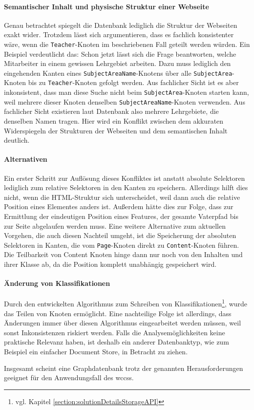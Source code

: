     \paragraph{Semantischer Inhalt und physische Struktur einer Webseite}
    Genau betrachtet spiegelt die Datenbank lediglich die Struktur der Webseiten exakt wider.
    Trotzdem lässt sich argumentieren, dass es fachlich konsistenter wäre,
    wenn die \texttt{Teacher}-Knoten im beschriebenen Fall geteilt werden würden.
    Ein Beispiel verdeutlicht das:
    Schon jetzt lässt sich die Frage beantworten,
    welche Mitarbeiter in einem gewissen Lehrgebiet arbeiten.
    Dazu muss lediglich den eingehenden Kanten eines
    \texttt{SubjectAreaName}-Knotens über alle \texttt{SubjectArea}-Knoten
    bis zu \texttt{Teacher}-Knoten gefolgt werden.
    Aus fachlicher Sicht ist es aber inkonsistent,
    dass man diese Suche nicht beim \texttt{SubjectArea}-Knoten
    starten kann, weil mehrere dieser Knoten denselben
    \texttt{SubjectAreaName}-Knoten verwenden.
    Aus fachlicher Sicht existieren laut Datenbank also mehrere Lehrgebiete,
    die denselben Namen tragen.
    Hier wird ein Konflikt zwischen dem akkuraten Widerspiegeln der Strukturen der Webseiten
    und dem semantischen Inhalt deutlich.

    \paragraph{Alternativen}
    Ein erster Schritt zur Auflösung dieses Konfliktes ist anstatt absolute Selektoren
    lediglich zum {\parentFeature} relative Selektoren in den Kanten zu speichern.
    Allerdings hilft dies nicht, wenn die HTML-Struktur sich unterscheidet,
    weil dann auch die relative Position eines Elementes anders ist.
    Außerdem hätte dies zur Folge, dass zur Ermittlung der eindeutigen Position
    eines Features, der gesamte Vaterpfad bis zur Seite abgelaufen werden muss.
    Eine weitere Alternative zum aktuellen Vorgehen,
    die auch diesen Nachteil umgeht,
    ist die Speicherung der absoluten Selektoren in Kanten,
    die vom \texttt{Page}-Knoten direkt zu \texttt{Content}-Knoten führen.
    Die Teilbarkeit von Content Knoten hinge dann nur noch von den Inhalten und ihrer Klasse ab,
    da die Position komplett unabhängig gespeichert wird.

    \paragraph{Änderung von Klassifikationen}
    Durch den entwickelten Algorithmus zum Schreiben von Klassifikationen\footnote{vgl. Kapitel \ref{section:solutionDetailsStorageAPI}},
    wurde das Teilen von Knoten ermöglicht.
    Eine nachteilige Folge ist allerdings,
    dass Änderungen immer über diesen Algorithmus eingearbeitet werden müssen,
    weil sonst Inkonsistenzen riskiert werden.
    Falls die Analysemöglichkeiten keine praktische Relevanz haben,
    ist deshalb ein anderer Datenbanktyp, wie zum Beispiel ein einfacher Document Store,
    in Betracht zu ziehen.

    Insgesamt scheint eine Graphdatenbank trotz der genannten Herausforderungen geeignet
    für den Anwendungsfall des \glspl{wccs}.
